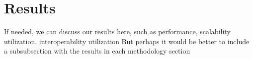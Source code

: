 \section{Results}\label{res}
If needed, we can discuss our results here, such as performance, scalability utilization, interoperability utilization
But perhaps it would be better to include a subsubsection with the results in each methodology section